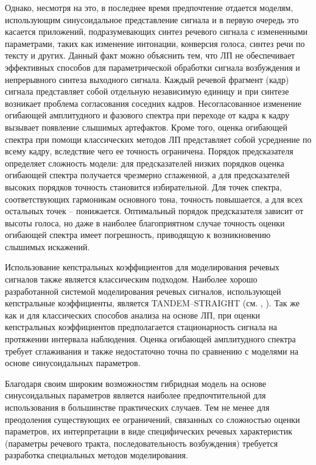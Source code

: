 Однако, несмотря на это, в последнее время предпочтение отдается моделям, использующим синусоидальное представление сигнала и в первую очередь это касается приложений, подразумевающих синтез речевого сигнала с измененными параметрами, таких как изменение интонации, конверсия голоса, синтез речи по тексту и других. Данный факт можно объяснить тем, что ЛП не обеспечивает эффективных способов для параметрической обработки сигнала возбуждения и непрерывного синтеза выходного сигнала. Каждый речевой фрагмент (кадр) сигнала представляет собой отдельную независимую единицу и при синтезе возникает проблема согласования соседних кадров. Несогласованное изменение огибающей амплитудного и фазового спектра при переходе от кадра к кадру вызывает появление слышимых артефактов. Кроме того, оценка огибающей спектра при помощи классических методов ЛП представляет собой усреднение по всему кадру, вследствие чего ее точность ограничена. Порядок предсказателя определяет сложность модели: для предсказателей низких порядков оценка огибающей спектра получается чрезмерно сглаженной, а для предсказателей высоких порядков точность становится избирательной. Для точек спектра, соответствующих гармоникам основного тона, точность повышается, а для всех остальных точек – понижается. Оптимальный порядок предсказателя зависит от высоты голоса, но даже в наиболее благоприятном случае точность оценки огибающей спектра имеет погрешность, приводящую к возникновению слышимых искажений.

Использование кепстральных коэффициентов для моделирования речевых сигналов также является классическим подходом. Наиболее хорошо разработанной системой моделирования речевых сигналов, использующей кепстральные коэффициенты, является TANDEM–STRAIGHT (см. , ). Так же как и для классических способов анализа на основе ЛП, при оценки кепстральных коэффициентов предполагается стационарность сигнала на протяжении интервала наблюдения. Оценка огибающей амплитудного спектра требует сглаживания и также недостаточно точна по сравнению с моделями на основе синусоидальных параметров.

Благодаря своим широким возможностям гибридная модель на основе синусоидальных параметров является наиболее предпочтительной для использования в большинстве практических случаев. Тем не менее для преодоления существующих ее ограничений, связанных со сложностью оценки параметров, их интерпретации в виде специфических речевых характеристик (параметры речевого тракта, последовательность возбуждения) требуется разработка специальных методов моделирования. 


